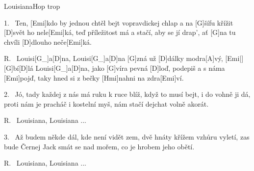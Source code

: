 \begin{song}{Louisiana}{Hop trop}

\begin{xverse}{1.~}
Ten, [Emi]kdo by jednou chtěl bejt vopravdickej chlap
a na [G]{šífu} křížit [D]svět ho nele[Emi]ká,
teď příležitost má a stačí, aby se jí drap',
ať [G]na tu chvíli [D]dlouho neče[Emi]ká.
\end{xverse}


\begin{xverse}{R.~}
Louisi[G_]{a}[D]{na}, Louisi[G_]a[D]na [G]zná už [D]dálky modra[A]vý, [Emi|]{}
[G]bí[D]lá Louisi[G_]a[D]na, jako [G]víra pevná [D]loď,
podepiš a s náma [Emi]pojď, taky hned si z bečky [Hmi]nahni na zdra[Emi]ví.
\end{xverse}


\begin{xverse}{2.~}
Jó, tady každej z nás má ruku k ruce blíž,
když to musí bejt, i do vohně ji dá,
proti nám je pracháč i kostelní myš,
nám stačí dejchat volně akorát.
\end{xverse}


\begin{xverse}{R.~}
Louisiana, Louisiana ...
\end{xverse}


\begin{xverse}{3.~}
Až budem někde dál, kde není vidět zem,
dvě hnáty křížem vzhůru vyletí,
zas bude Černej Jack smát se nad mořem,
co je hrobem jeho obětí.
\end{xverse}

\begin{xverse}{R.~}
Louisiana, Louisiana ...
\end{xverse}

\end{song}

